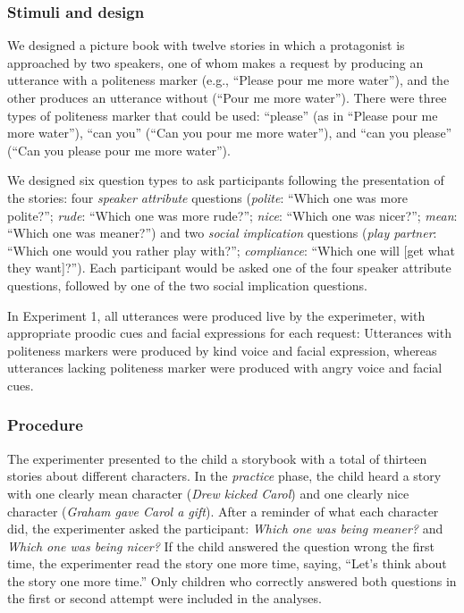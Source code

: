 \documentclass[oneside]{report}
\begin{document}
\subsubsection{Stimuli and design}\label{stimuli-and-design}

We designed a picture book with twelve stories in which a protagonist is
approached by two speakers, one of whom makes a request by producing an
utterance with a politeness marker (e.g., ``Please pour me more
water''), and the other produces an utterance without (``Pour me more
water''). There were three types of politeness marker that could be
used: ``please'' (as in ``Please pour me more water''), ``can you''
(``Can you pour me more water''), and ``can you please'' (``Can you
please pour me more water'').

We designed six question types to ask participants following the
presentation of the stories: four \emph{speaker attribute} questions
(\emph{polite}: ``Which one was more polite?''; \emph{rude}: ``Which one
was more rude?''; \emph{nice}: ``Which one was nicer?''; \emph{mean}:
``Which one was meaner?'') and two \emph{social implication} questions
(\emph{play partner}: ``Which one would you rather play with?'';
\emph{compliance}: ``Which one will {[}get what they want{]}?''). Each
participant would be asked one of the four speaker attribute questions,
followed by one of the two social implication questions.

In Experiment 1, all utterances were produced live by the experimeter,
with appropriate proodic cues and facial expressions for each request:
Utterances with politeness markers were produced by kind voice and
facial expression, whereas utterances lacking politeness marker were
produced with angry voice and facial cues.

\subsubsection{Procedure}\label{procedure}

The experimenter presented to the child a storybook with a total of
thirteen stories about different characters. In the \emph{practice}
phase, the child heard a story with one clearly mean character
(\emph{Drew kicked Carol}) and one clearly nice character (\emph{Graham
gave Carol a gift}). After a reminder of what each character did, the
experimenter asked the participant: \emph{Which one was being meaner?}
and \emph{Which one was being nicer?} If the child answered the question
wrong the first time, the experimenter read the story one more time,
saying, ``Let's think about the story one more time.'' Only children who
correctly answered both questions in the first or second attempt were
included in the analyses.
\end{document}
